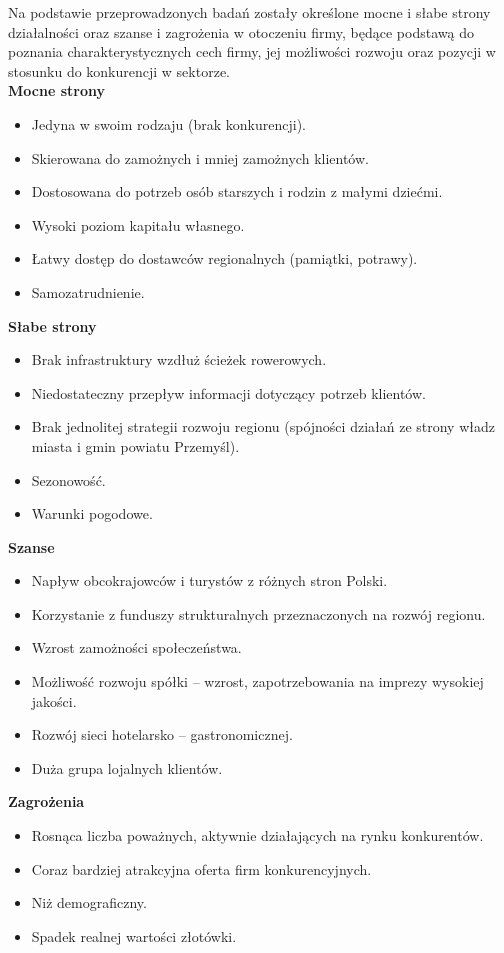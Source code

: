 \documentclass{sprawozdanie-agh}
\begin{document}
		Na podstawie przeprowadzonych badań zostały określone mocne i słabe strony działalności oraz szanse i zagrożenia w otoczeniu firmy, będące podstawą do poznania charakterystycznych cech firmy, jej możliwości rozwoju oraz pozycji w stosunku do konkurencji w sektorze.\\
		\textbf{Mocne strony}
		\begin{itemize}
			\item Jedyna w swoim rodzaju (brak konkurencji).
			\item Skierowana do zamożnych i mniej zamożnych klientów.
			\item Dostosowana do potrzeb osób starszych i rodzin z małymi dziećmi.
			\item Wysoki poziom kapitału własnego.
			\item Łatwy dostęp do dostawców regionalnych (pamiątki, potrawy).
			\item Samozatrudnienie.
		\end{itemize}
		\textbf{Słabe strony}
		\begin{itemize}
			\item Brak infrastruktury wzdłuż ścieżek rowerowych.
			\item Niedostateczny przepływ informacji dotyczący potrzeb klientów.
			\item Brak jednolitej strategii rozwoju regionu (spójności działań ze strony władz miasta i gmin powiatu Przemyśl).
			\item Sezonowość.
			\item Warunki pogodowe.
		\end{itemize}
		\textbf{Szanse}
		\begin{itemize}
			\item Napływ obcokrajowców i turystów z różnych stron Polski.
			\item Korzystanie z funduszy strukturalnych przeznaczonych na rozwój regionu.
			\item Wzrost zamożności społeczeństwa.
			\item Możliwość rozwoju spółki – wzrost, zapotrzebowania na imprezy wysokiej jakości.
			\item Rozwój sieci hotelarsko – gastronomicznej.
			\item Duża grupa lojalnych klientów.
		\end{itemize}
		\textbf{Zagrożenia}
		\begin{itemize}
			\item Rosnąca liczba poważnych, aktywnie działających na rynku konkurentów.
			\item Coraz bardziej atrakcyjna oferta firm konkurencyjnych.
			\item Niż demograficzny.
			\item Spadek realnej wartości złotówki.
		\end{itemize}
\end{document}
